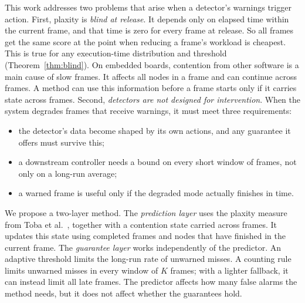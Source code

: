 \documentclass[acmsmall,screen]{acmart}
\begin{document}
This work addresses two problems that arise when a detector's warnings trigger action. First, plaxity is \emph{blind at release}. It depends only on elapsed time within the current frame, and that time is zero for every frame at release. So all frames get the same score at the point when reducing a frame's workload is cheapest. This is true for any execution-time distribution and threshold (Theorem~\ref{thm:blind}). On embedded boards, contention from other software is a main cause of slow frames. It affects all nodes in a frame and can continue across frames. A method can use this information before a frame starts only if it carries state across frames. Second, \emph{detectors are not designed for intervention}. When the system degrades frames that receive warnings, it must meet three requirements:
\begin{itemize}
\item the detector's data become shaped by its own actions, and any guarantee it offers must survive this;
\item a downstream controller needs a bound on every short window of frames, not only on a long-run average;
\item a warned frame is useful only if the degraded mode actually finishes in time.
\end{itemize}

We propose a two-layer method. The \emph{prediction layer} uses the plaxity measure from Toba et al.~\cite{toba2024,toba2026}, together with a contention state carried across frames. It updates this state using completed frames and nodes that have finished in the current frame. The \emph{guarantee layer} works independently of the predictor. An adaptive threshold limits the long-run rate of unwarned misses. A counting rule limits unwarned misses in every window of $K$ frames; with a lighter fallback, it can instead limit all late frames. The predictor affects how many false alarms the method needs, but it does not affect whether the guarantees hold.
\end{document}
